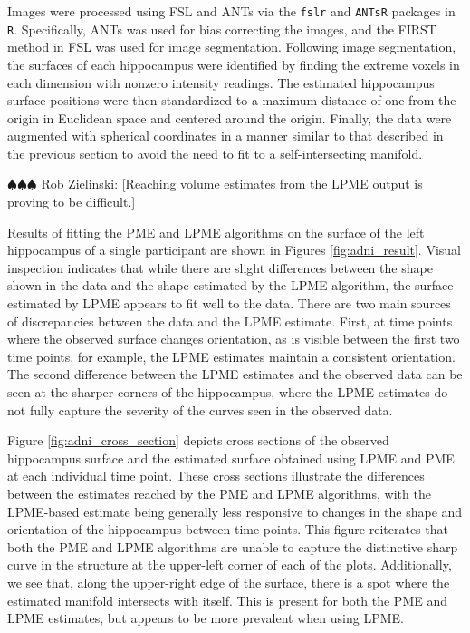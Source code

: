 \documentclass[11pt,reqno]{article}
\newcommand{\zielinski}[1]{{\color{blue} \sf $\spadesuit\spadesuit\spadesuit$ Rob Zielinski: [#1]}}
\theoremstyle{definition}
\begin{document}
Images were processed using FSL and ANTs via the \texttt{fslr} and \texttt{ANTsR} packages in \texttt{R}. Specifically, ANTs was used for bias correcting the images, and the FIRST method in FSL was used for image segmentation. Following image segmentation, the surfaces of each hippocampus were identified by finding the extreme voxels in each dimension with nonzero intensity readings. The estimated hippocampus surface positions were then standardized to a maximum distance of one from the origin in Euclidean space and centered around the origin. Finally, the data were augmented with spherical coordinates in a manner similar to that described in the previous section to avoid the need to fit to a self-intersecting manifold.

\zielinski{Reaching volume estimates from the LPME output is proving to be difficult.}

Results of fitting the PME and LPME algorithms on the surface of the left hippocampus of a single participant are shown in Figures \ref{fig:adni_result}. Visual inspection indicates that while there are slight differences between the shape shown in the data and the shape estimated by the LPME algorithm, the surface estimated by LPME appears to fit well to the data. There are two main sources of discrepancies between the data and the LPME estimate. First, at time points where the observed surface changes orientation, as is visible between the first two time points, for example, the LPME estimates maintain a consistent orientation. The second difference between the LPME estimates and the observed data can be seen at the sharper corners of the hippocampus, where the LPME estimates do not fully capture the severity of the curves seen in the observed data.

Figure \ref{fig:adni_cross_section} depicts cross sections of the observed hippocampus surface and the estimated surface obtained using LPME and PME at each individual time point. These cross sections illustrate the differences between the estimates reached by the PME and LPME algorithms, with the LPME-based estimate being generally less responsive to changes in the shape and orientation of the hippocampus between time points. This figure reiterates that both the PME and LPME algorithms are unable to capture the distinctive sharp curve in the structure at the upper-left corner of each of the plots. Additionally, we see that, along the upper-right edge of the surface, there is a spot where the estimated manifold intersects with itself. This is present for both the PME and LPME estimates, but appears to be more prevalent when using LPME.
\end{document}
